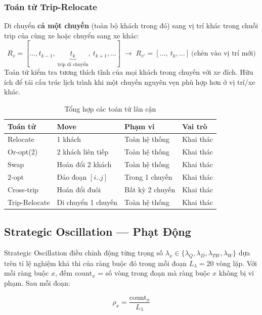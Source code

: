 \documentclass[../DoAn.tex]{subfiles}
\begin{document}
\subsubsection{Toán tử Trip-Relocate}

Di chuyển \textbf{cả một chuyến} (toàn bộ khách trong đó) sang vị trí khác trong chuỗi trip của cùng xe hoặc chuyển sang xe khác:
\[
R_v = [\ldots, t_{k-1},\ \underbrace{t_k}_{\text{trip di chuyển}},\ t_{k+1},\ldots]
\;\longrightarrow\;
R_{v'} = [\ldots,\ t_k,\ldots]\ \text{(chèn vào vị trí mới)}
\]
Toán tử kiểm tra tương thích tĩnh của mọi khách trong chuyến với xe đích. Hữu ích để tái cấu trúc lịch trình khi một chuyến nguyên vẹn phù hợp hơn ở vị trí/xe khác.

\begin{table}[H]
\centering
\caption{Tổng hợp các toán tử lân cận}
\label{tab:operators}
\begin{tabular}{llll}
\toprule
\textbf{Toán tử} & \textbf{Move} & \textbf{Phạm vi} & \textbf{Vai trò} \\
\midrule
Relocate         & 1 khách             & Toàn hệ thống        & Khai thác \\
Or-opt(2)        & 2 khách liên tiếp   & Toàn hệ thống        & Khai thác \\
Swap             & Hoán đổi 2 khách    & Toàn hệ thống        & Khai thác \\
2-opt            & Đảo đoạn $[i..j]$   & Trong 1 chuyến       & Khai thác \\
Cross-trip       & Hoán đổi đuôi       & Bất kỳ 2 chuyến      & Khai thác \\
Trip-Relocate    & Di chuyển 1 chuyến  & Toàn hệ thống        & Khai thác \\
\bottomrule
\end{tabular}
\end{table}

\subsection{Strategic Oscillation --- Phạt Động}
\label{subsec:so}

Strategic Oscillation điều chỉnh động từng trọng số $\lambda_x \in \{\lambda_Q, \lambda_D, \lambda_{TW}, \lambda_W\}$ dựa trên tỉ lệ nghiệm khả thi của ràng buộc đó trong mỗi đoạn $L_\lambda = 20$ vòng lặp. Với mỗi ràng buộc $x$, đếm $\text{count}_x$ = số vòng trong đoạn mà ràng buộc $x$ không bị vi phạm. Sau mỗi đoạn:

\[
\rho_x = \frac{\text{count}_x}{L_\lambda}
\]
\end{document}
